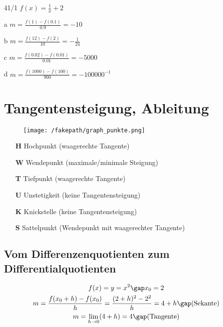 \begin{exercise}{41/1}
  $f(x) = \frac{1}{x} + 2$
  \item [a] $m = \frac{f(1) - f(0.1)}{0.9} = -10$
  \item [b] $m = \frac{f(12) - f(2)}{10} = -\frac{1}{24}$
  \item [c] $m = \frac{f(0.02) - f(0.01)}{0.01} = -5000$
  \item [d] $m = \frac{f(1000) - f(100)}{900} = -100000^{-1}$
\end{exercise}
\section{Tangentensteigung, Ableitung}
\begin{figure}[H]
  \centering
  \texttt{[image: /fakepath/graph\_punkte.png]}
\end{figure}
\begin{enumerate}
  \item [\textbf{H}] Hochpunkt (waagerechte Tangente)
  \item [\textbf{W}] Wendepunkt (maximale/minimale Steigung)
  \item [\textbf{T}] Tiefpunkt (waagerechte Tangente)
  \item [\textbf{U}] Unstetigkeit (keine Tangentensteigung)
  \item [\textbf{K}] Knickstelle (keine Tangentensteigung)
  \item [\textbf{S}] Sattelpunkt (Wendepunkt mit waagerechter Tangente)
\end{enumerate}
\subsection{Vom Differenzenquotienten zum Differentialquotienten}
\begin{gather*}
  f(x) = y = x^2\gap x_0 = 2 \\
  m = \frac{f(x_0 + h) - f(x_0)}{h} = \frac{(2 + h)^2 - 2^2}{h} = 4 + h \gap\text{(Sekante)} \\
  m = \lim\limits_{h \to 0} (4 + h) = 4 \gap\text{(Tangente)}
\end{gather*}
